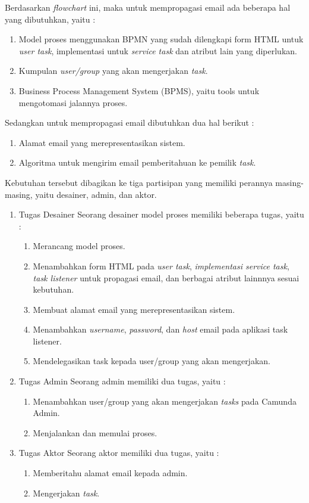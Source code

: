 Berdasarkan \textit{flowchart} ini, maka untuk mempropagasi email ada beberapa hal yang dibutuhkan, yaitu :
\begin{enumerate}
	\item Model proses menggunakan BPMN yang sudah dilengkapi form HTML untuk \textit{user task}, implementasi untuk \textit{service task} dan atribut lain yang diperlukan.
	\item Kumpulan \textit{user/group} yang akan mengerjakan \textit{task}.
	\item Business Process Management System (BPMS), yaitu tools untuk mengotomasi jalannya proses.
\end{enumerate}
Sedangkan untuk mempropagasi email dibutuhkan dua hal berikut :
\begin{enumerate}
	\item Alamat email yang merepresentasikan sistem.
	\item Algoritma untuk mengirim email pemberitahuan ke pemilik \textit{task}.
\end{enumerate}


Kebutuhan tersebut dibagikan ke tiga partisipan yang memiliki perannya masing-masing, yaitu desainer, admin, dan aktor.

\begin{enumerate}
\item Tugas Desainer 
Seorang desainer model proses memiliki beberapa tugas, yaitu :
\begin{enumerate}
	\item Merancang model proses.
	\item Menambahkan form HTML pada \textit{user task}, \textit{implementasi service task}, \textit{task listener} untuk propagasi email, dan berbagai atribut lainnnya sesuai kebutuhan.
	\item Membuat alamat email yang merepresentasikan sistem.
	\item Menambahkan \textit{username}, \textit{password}, dan \textit{host} email pada aplikasi task listener.
	\item Mendelegasikan task kepada user/group yang akan mengerjakan.
\end{enumerate}

\item Tugas Admin
Seorang admin memiliki dua tugas, yaitu :
\begin{enumerate}
	\item Menambahkan user/group yang akan mengerjakan \textit{tasks} pada Camunda Admin.
	\item Menjalankan dan memulai proses.
\end{enumerate}

\item Tugas Aktor
Seorang aktor memiliki dua tugas, yaitu :
\begin{enumerate}
	\item Memberitahu alamat email kepada admin.
	\item Mengerjakan \textit{task}.
\end{enumerate}

\end{enumerate}


